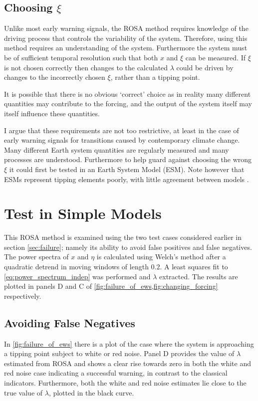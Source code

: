 \subsection{Choosing $\xi$}
Unlike most early warning signals, the ROSA method requires knowledge of
the driving process that controls the variability of the system.
Therefore, using this method requires an understanding
of the system. Furthermore the system must be of sufficient temporal resolution such that 
both $x$ and $\xi$ can be measured. If $\xi$ is not chosen
correctly then changes to the calculated $\lambda$ could be driven
by changes to the incorrectly chosen $\xi$, rather than a 
tipping point.

It is possible that there is no obvious `correct' choice as in reality many different quantities may
contribute to the forcing, and the output of the system itself may itself influence these quantities. 

I argue that these requirements are not too restrictive, at least in the 
case of early warning signals for transitions caused by contemporary
climate change. Many different Earth system quantities are regularly 
measured and many processes are understood. Furthermore to help 
guard against choosing the wrong $\xi$ it could first be tested in an Earth System Model (ESM). Note however that ESMs represent tipping elements 
poorly, with little agreement between models \parencite{Drijfhout2015}.


\section{Test in Simple Models}
This ROSA method is examined using the two test cases considered earlier in 
section \cref{sec:failure}; namely its ability to avoid 
false positives and false negatives.
The power spectra of $x$ and $\eta$ is calculated 
using Welch's method \parencite{Welch1967} after a quadratic 
detrend in moving windows of length $0.2$. A least
squares fit to
\cref{eq:power_spectrum_indep} was performed and $\lambda$ extracted. 
The results are plotted in panels D and C of \cref{fig:failure_of_ews,fig:changing_forcing} respectively.

\subsection{Avoiding False Negatives}
In \cref{fig:failure_of_ews} there is a plot of the case
where the system is approaching a tipping point
subject to white or red noise. Panel D provides
the value of $\lambda$ estimated from ROSA and shows a clear
rise towards zero in both the white and red noise case indicating
a successful warning, in contrast to the classical indicators. Furthermore, both the
white and red noise estimates lie close to the true value of 
$\lambda$, plotted in the black curve.

